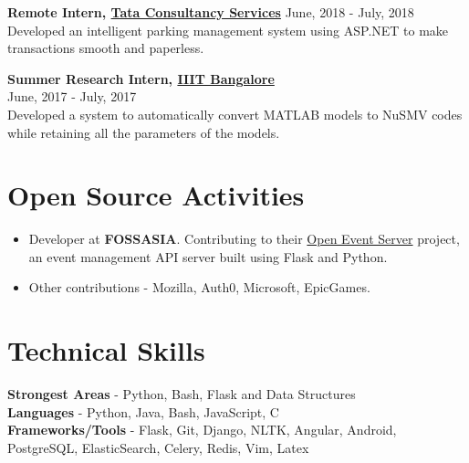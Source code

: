 \documentclass[margin, centered] {res}
\begin{document}
\begin{resume}
\textbf{Remote Intern, \href{https://www.tcs.com/}{Tata Consultancy Services}}  \hfill June, 2018 - July, 2018 \\
Developed an intelligent parking management system using ASP.NET to make transactions smooth and paperless.\

\textbf{Summer Research Intern, \href{https://www.iiitb.ac.in}{IIIT Bangalore}} \\
\hfill June, 2017 - July, 2017 \\
Developed a system to automatically convert MATLAB models to NuSMV codes while retaining all the parameters of the models.\

\section{Open Source Activities}
\begin{itemize}[leftmargin=*]
\item  Developer at \textbf{FOSSASIA}. Contributing to their \href{https://github.com/fossasia/open-event-server}{Open Event Server} project, an event management API server built using Flask and Python.
\item Other contributions - Mozilla, Auth0, Microsoft, EpicGames.
\end{itemize}


\section{Technical \hspace{2mm} Skills}
\textbf{Strongest Areas} - Python, Bash, Flask and Data Structures\\
\textbf{Languages} - Python, Java, Bash, JavaScript, C\\
\textbf{Frameworks/Tools} - Flask, Git, Django, NLTK, Angular, Android, PostgreSQL, ElasticSearch, Celery, Redis, Vim, Latex



\end{resume}
\end{document}
